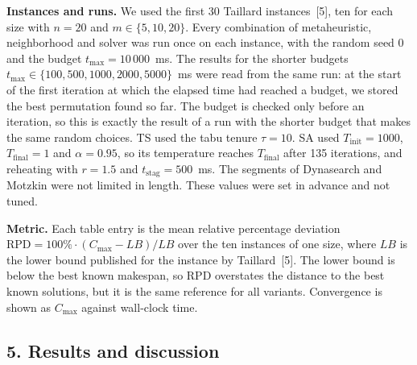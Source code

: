 \documentclass[12pt]{article}
\begin{document}
{\textbf{Instances and runs.} We used the first 30 Taillard instances~[5], ten for each size with $n=20$ and $m\in\{5,10,20\}$. Every combination of metaheuristic, neighborhood and solver was run once on each instance, with the random seed 0 and the budget $t_{\max}=10\,000$~ms. The results for the shorter budgets $t_{\max}\in\{100,500,1000,2000,5000\}$~ms were read from the same run: at the start of the first iteration at which the elapsed time had reached a budget, we stored the best permutation found so far. The budget is checked only before an iteration, so this is exactly the result of a run with the shorter budget that makes the same random choices. TS used the tabu tenure $\tau=10$. SA used $T_{\text{init}}=1000$, $T_{\text{final}}=1$ and $\alpha=0.95$, so its temperature reaches $T_{\text{final}}$ after 135 iterations, and reheating with $r=1.5$ and $t_{\text{stag}}=500$~ms. The segments of Dynasearch and Motzkin were not limited in length. These values were set in advance and not tuned.

\textbf{Metric.} Each table entry is the mean relative percentage deviation $\mathrm{RPD}=100\%\cdot(C_{\max}-LB)/LB$ over the ten instances of one size, where $LB$ is the lower bound published for the instance by Taillard~[5]. The lower bound is below the best known makespan, so RPD overstates the distance to the best known solutions, but it is the same reference for all variants. Convergence is shown as $C_{\max}$ against wall-clock time.}

\subsection*{5. Results and discussion}
\end{document}
